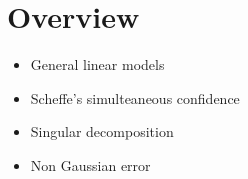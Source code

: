 \documentclass[11pt,fleqn]{book} %
\begin{document}
\section{Overview}

\begin{itemize}
	\item General linear models
	\item Scheffe's simulteaneous confidence
	\item Singular decomposition
	\item Non Gaussian error
\end{itemize}








\end{document}
